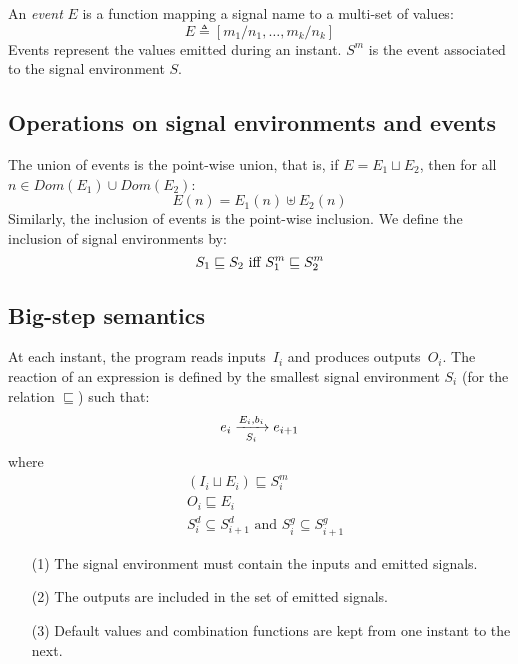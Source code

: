 \documentclass[9pt,preprint]{sigplanconf}
\newcommand{\deq}{\triangleq}
\begin{document}
An \emph{event} $E$ is a function mapping a signal name to a multi-set of values:
\[ E \deq [ m_1/n_1, \dots, m_k/n_k] \]
Events represent the values emitted during an instant. $S^m$ is the event associated to the signal environment $S$.

\subsection*{Operations on signal environments and events}

The union of events is the point-wise union, that is, if $E = E_1 \sqcup E_2$, then for all  $n \in \mathit{Dom}(E_1) \cup \mathit{Dom}(E_2)$: 
\[ E(n) = E_1(n) \uplus E_2(n) \]
Similarly, the inclusion of events is the point-wise inclusion. We define the inclusion of signal environments by:
\[ S_1 \sqsubseteq S_2 \text{ iff } S^m_1 \sqsubseteq S^m_2 \\ \]


\subsection{Big-step semantics}

At each instant, the program reads inputs~$I_i$ and produces outputs~$O_i$. The reaction of an expression is defined by the smallest signal environment $S_i$ (for the relation $\sqsubseteq$) such that:
\[ \bigstep{N}{e_i}{e_{i+1}}{E_i}{b_i}{S_i} \]
where
\begin{align}
& (I_i \sqcup E_i ) \sqsubseteq S_i^m \\
& O_i \sqsubseteq E_i \\
& S^d_i \subseteq S^d_{i+1} \text{ and } S^g_i \subseteq S^g_{i+1} 
\end{align}
\begin{itemize}
\item[(1)] The signal environment must contain the inputs and emitted signals.
\item[(2)] The outputs are included in the set of emitted signals.
\item[(3)] Default values and combination functions are kept from one instant to the next.
\end{itemize}
\end{document}
